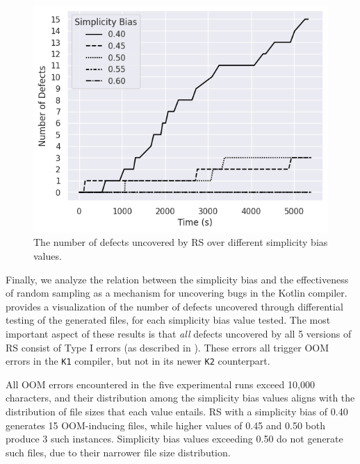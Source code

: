 \begin{figure}
    \centering
    \includegraphics[scale=0.6]{img/rq1-1/convergence-rq-1-1.png}
    \caption{The number of defects uncovered by \gls{RS} over different simplicity bias values.}
    \label{fig:rq1-1convergence}
\end{figure}


Finally, we analyze the relation between the simplicity bias
and the effectiveness of random sampling as a
mechanism for uncovering bugs in the Kotlin compiler.
 provides a visualization of the number of
defects uncovered through differential testing of the generated files,
for each simplicity bias value tested.
The most important aspect of these results is that \textit{all} defects
uncovered by all 5 versions of \gls{RS} consist of
Type I errors (as described in ).
These errors all trigger \gls{OOM} errors in the \texttt{K1}
compiler, but not in its newer \texttt{K2} counterpart.

All \gls{OOM} errors encountered in the five experimental runs
exceed 10,000 characters, and their distribution among the
simplicity bias values aligns with the distribution
of file sizes that each value entails.
\gls{RS} with a simplicity bias of 0.40 generates 15 \gls{OOM}-inducing
files, while higher values of 0.45 and 0.50 both produce 3 such instances.
Simplicity bias values exceeding 0.50 do not generate such files,
due to their narrower file size distribution.

\begin{center}
\end{center}

